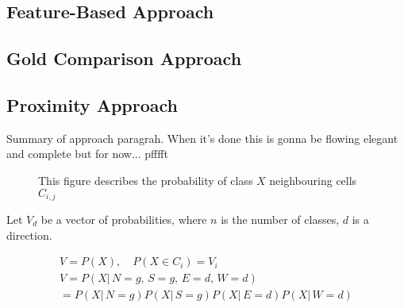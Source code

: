 \documentclass[preprint,5p,times,twocolumn]{elsarticle}
\begin{document}
\subsection{Feature-Based Approach}
\label{process:featurebased}
\lipsum[1-2]

\subsection{Gold Comparison Approach}
\label{process:gold}

\subsection{Proximity Approach}
\label{process:proximity}

Summary of approach paragrah. When it's done this is gonna be flowing elegant
and complete but for now... pfffft %

\begin{figure}[h]
\begin{center}
\end{center}
\caption{This figure describes the probability of class $X$ neighbouring cells $C_{i,j}$}
\end{figure}

Let $V_{d}$ be a vector of probabilities, where $n$ is the number of classes,
$d$ is a direction.

\[
\begin{array}{l}
V = P(X),\quad P(X \in C_i) = V_i \\
V = P(X|\,N\!=\!g,\,S\!=\!g,\,E\!=\!d,\,W\!=\!d)  \\
= P(X|\,N\!=\!g)P(X|\,S\!=\!g)P(X|\,E\!=\!d)P(X|\,W\!=\!d) \\
\end{array}
\]
\end{document}
